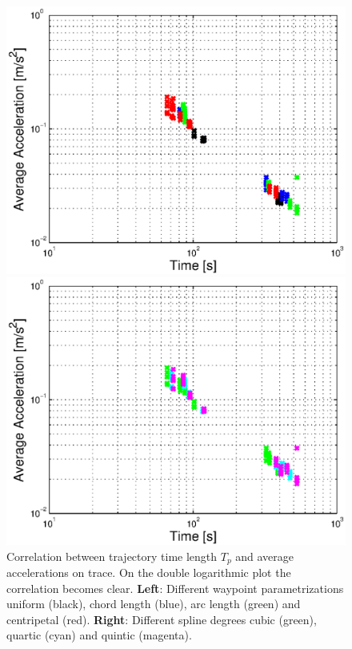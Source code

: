 \begin{figure}[H]
  \begin{minipage}[t]{0.48\textwidth}
    \includegraphics[width = \textwidth]{correlation/Control_Correlation_Time_Acc_Parametrization}
  \end{minipage}
  \hfill
  \begin{minipage}[t]{0.48\textwidth}
    \includegraphics[width = \textwidth]{correlation/Control_Correlation_Time_Acc_SplineDegree}
  \end{minipage}
  \caption{Correlation between trajectory time length $T_p$ and average accelerations on trace. On the double logarithmic plot the correlation becomes clear. {\bf Left}: Different waypoint parametrizations uniform (black), chord length (blue), arc length (green) and centripetal (red). {\bf Right}: Different spline degrees cubic (green), quartic (cyan) and quintic (magenta).}
  \label{fig:correlation_time_acc}
\end{figure}


